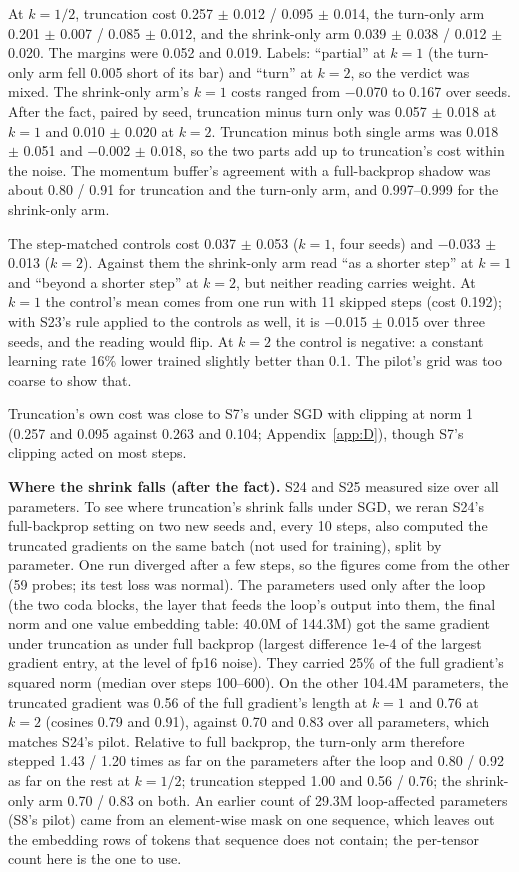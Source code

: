 \documentclass[10pt]{article}
\begin{document}
At $k = 1 / 2$, truncation cost 0.257 $\pm$ 0.012 / 0.095 $\pm$ 0.014, the turn-only arm 0.201 $\pm$ 0.007 / 0.085 $\pm$ 0.012, and the shrink-only arm 0.039 $\pm$ 0.038 / 0.012 $\pm$ 0.020. The margins were 0.052 and 0.019. Labels: ``partial'' at $k = 1$ (the turn-only arm fell 0.005 short of its bar) and ``turn'' at $k = 2$, so the verdict was mixed. The shrink-only arm's $k = 1$ costs ranged from $-$0.070 to 0.167 over seeds. After the fact, paired by seed, truncation minus turn only was 0.057 $\pm$ 0.018 at $k = 1$ and 0.010 $\pm$ 0.020 at $k = 2$. Truncation minus both single arms was 0.018 $\pm$ 0.051 and $-$0.002 $\pm$ 0.018, so the two parts add up to truncation's cost within the noise. The momentum buffer's agreement with a full-backprop shadow was about 0.80 / 0.91 for truncation and the turn-only arm, and 0.997--0.999 for the shrink-only arm.

The step-matched controls cost 0.037 $\pm$ 0.053 ($k = 1$, four seeds) and $-$0.033 $\pm$ 0.013 ($k = 2$). Against them the shrink-only arm read ``as a shorter step'' at $k = 1$ and ``beyond a shorter step'' at $k = 2$, but neither reading carries weight. At $k = 1$ the control's mean comes from one run with 11 skipped steps (cost 0.192); with S23's rule applied to the controls as well, it is $-$0.015 $\pm$ 0.015 over three seeds, and the reading would flip. At $k = 2$ the control is negative: a constant learning rate 16\% lower trained slightly better than 0.1. The pilot's grid was too coarse to show that.

Truncation's own cost was close to S7's under SGD with clipping at norm 1 (0.257 and 0.095 against 0.263 and 0.104; Appendix~\ref{app:D}), though S7's clipping acted on most steps.

\textbf{Where the shrink falls (after the fact).} S24 and S25 measured size over all parameters. To see where truncation's shrink falls under SGD, we reran S24's full-backprop setting on two new seeds and, every 10 steps, also computed the truncated gradients on the same batch (not used for training), split by parameter. One run diverged after a few steps, so the figures come from the other (59 probes; its test loss was normal). The parameters used only after the loop (the two coda blocks, the layer that feeds the loop's output into them, the final norm and one value embedding table: 40.0M of 144.3M) got the same gradient under truncation as under full backprop (largest difference 1e-4 of the largest gradient entry, at the level of fp16 noise). They carried 25\% of the full gradient's squared norm (median over steps 100--600). On the other 104.4M parameters, the truncated gradient was 0.56 of the full gradient's length at $k = 1$ and 0.76 at $k = 2$ (cosines 0.79 and 0.91), against 0.70 and 0.83 over all parameters, which matches S24's pilot. Relative to full backprop, the turn-only arm therefore stepped 1.43 / 1.20 times as far on the parameters after the loop and 0.80 / 0.92 as far on the rest at $k = 1 / 2$; truncation stepped 1.00 and 0.56 / 0.76; the shrink-only arm 0.70 / 0.83 on both. An earlier count of 29.3M loop-affected parameters (S8's pilot) came from an element-wise mask on one sequence, which leaves out the embedding rows of tokens that sequence does not contain; the per-tensor count here is the one to use.
\end{document}
